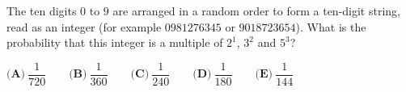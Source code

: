 The ten digits $0$ to $9$ are arranged in a random order to form a ten-digit string, read as an integer (for example $0981276345$ or $9018723654$). What is the probability that this integer is a multiple of $2^1$, $3^2$ and $5^3$?

$\textbf{(A)}\ \dfrac1{720}\qquad\textbf{(B)}\ \dfrac1{360}\qquad\textbf{(C)}\ \dfrac1{240}\qquad\textbf{(D)}\ \dfrac1{180}\qquad\textbf{(E)}\ \dfrac1{144}$
